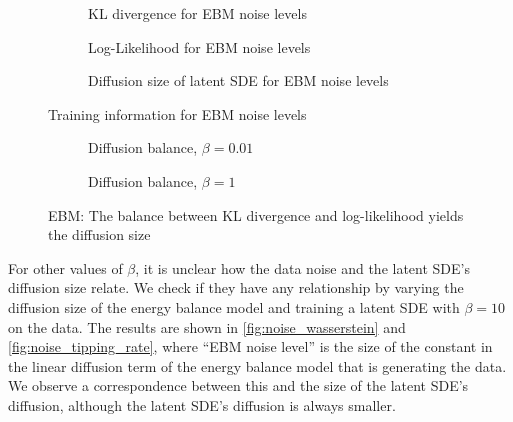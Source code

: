 \documentclass[twoside,11pt]{article}
\begin{document}
\begin{figure}
    \begin{subfigure}{.5\textwidth}
        \centering
        
        \caption{KL divergence for EBM noise levels}
    \end{subfigure}
    \begin{subfigure}{.5\textwidth}
        \centering
        
        \caption{Log-Likelihood for EBM noise levels}
    \end{subfigure}
    \begin{subfigure}{\textwidth}
        \centering
        
        \caption{Diffusion size of latent SDE for EBM noise levels}
    \end{subfigure}
    \caption{Training information for EBM noise levels}
    \label{fig:noise_kl_logpxs}
\end{figure}

\begin{figure}
    \begin{subfigure}{.5\textwidth}
        \centering
        
        \caption{Diffusion balance, \(\beta=0.01\)}
    \end{subfigure}
    \begin{subfigure}{0.5\textwidth}
        \centering
        
        \caption{Diffusion balance, \(\beta=1\)}
    \end{subfigure}
    \caption{EBM: The balance between KL divergence and log-likelihood yields the diffusion size}
    \label{fig:balance}
\end{figure}

For other values of \(\beta\), it is unclear how the data noise and the latent SDE's diffusion size relate. We check if they have any relationship by varying the diffusion size of the energy balance model and training a latent SDE with \(\beta=10\) on the data. The results are shown in \cref{fig:noise_wasserstein} and \cref{fig:noise_tipping_rate}, where \enquote{EBM noise level} is the size of the constant in the linear diffusion term of the energy balance model that is generating the data. We observe a correspondence between this and the size of the latent SDE's diffusion, although the latent SDE's diffusion is always smaller.
\end{document}
